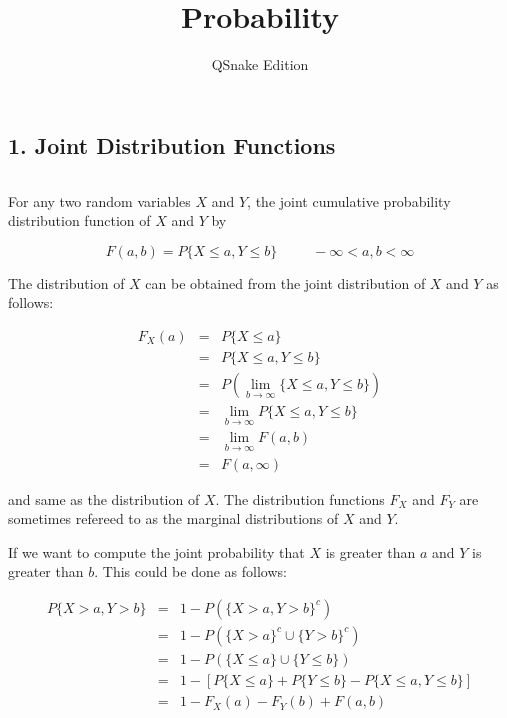 


\title{Probability}

\author{QSnake Edition}

\maketitle

\subsection*{1. Joint Distribution Functions}$ $

For any two random variables $X$ and $Y$, the joint cumulative probability distribution function of $X$ and $Y$ by

$$F(a,b) = P\{X \leq a,Y \leq b\} \hspace{30pt} - \infty < a,b < \infty$$

The distribution of $X$ can be obtained from the joint distribution of $X$ and $Y$ as follows:

\begin{eqnarray*}
	F_X(a) &=& P\{X \leq a\}\\
	&=& P\{X \leq a,Y \leq b\}\\
	&=&P\left(\lim_{b \rightarrow \infty} \{ X \leq a,Y\leq b \}\right)\\
	&=& \lim_{b \rightarrow \infty} P\{X \leq a,Y \leq b\}\\
	&=& \lim_{b \rightarrow \infty} F(a,b)\\
	&=& F(a,\infty)
\end{eqnarray*}

and same as the distribution of $X$. The distribution functions $F_X$ and $F_Y$ are sometimes refereed to as the marginal distributions of $X$ and $Y$.

If we want to compute the joint probability that $X$ is greater than $a$ and $Y$ is greater than $b$. This could be done as follows:

\begin{eqnarray*}
	P\{X > a,Y > b\} &=& 1 - P(\{X > a,Y > b\}^c)\\
	&=& 1 - P(\{X > a\}^c \cup \{Y > b\}^c)\\
	&=& 1 - P(\{X \leq a\} \cup \{Y \leq b\})\\
	&=& 1 - [P\{X \leq a\} + P\{Y \leq b\} - P\{X \leq a,Y \leq b\}]\\
	&=& 1 - F_X(a) - F_Y(b) + F(a,b)
\end{eqnarray*}

